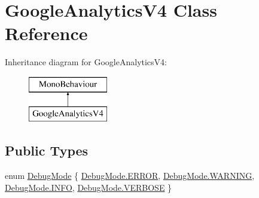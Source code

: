 \hypertarget{class_google_analytics_v4}{}\section{Google\+Analytics\+V4 Class Reference}
\label{class_google_analytics_v4}
Inheritance diagram for Google\+Analytics\+V4\+:\begin{figure}[H]
\begin{center}
\leavevmode
\includegraphics[height=2.000000cm]{class_google_analytics_v4}
\end{center}
\end{figure}
\subsection*{Public Types}
\begin{DoxyCompactItemize}
\item 
enum \hyperlink{class_google_analytics_v4_a53191bc619081f5781932db905fbf30d}{Debug\+Mode} \{ \hyperlink{class_google_analytics_v4_a53191bc619081f5781932db905fbf30dabb1ca97ec761fc37101737ba0aa2e7c5}{Debug\+Mode.\+E\+R\+R\+OR}, 
\hyperlink{class_google_analytics_v4_a53191bc619081f5781932db905fbf30da059e9861e0400dfbe05c98a841f3f96b}{Debug\+Mode.\+W\+A\+R\+N\+I\+NG}, 
\hyperlink{class_google_analytics_v4_a53191bc619081f5781932db905fbf30da551b723eafd6a31d444fcb2f5920fbd3}{Debug\+Mode.\+I\+N\+FO}, 
\hyperlink{class_google_analytics_v4_a53191bc619081f5781932db905fbf30daec1f06e9fb39c4ef0729b3c7c9c8e8cc}{Debug\+Mode.\+V\+E\+R\+B\+O\+SE}
 \}
\end{DoxyCompactItemize}
